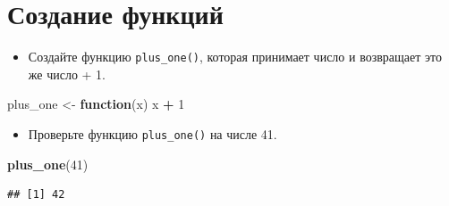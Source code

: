 \documentclass[]{book}
\newenvironment{Shaded}{\begin{snugshade}}{\end{snugshade}}
\newcommand{\KeywordTok}[1]{\textcolor[rgb]{0.13,0.29,0.53}{\textbf{#1}}}
\newcommand{\DecValTok}[1]{\textcolor[rgb]{0.00,0.00,0.81}{#1}}
\newcommand{\StringTok}[1]{\textcolor[rgb]{0.31,0.60,0.02}{#1}}
\newcommand{\CommentTok}[1]{\textcolor[rgb]{0.56,0.35,0.01}{\textit{#1}}}
\newcommand{\ControlFlowTok}[1]{\textcolor[rgb]{0.13,0.29,0.53}{\textbf{#1}}}
\newcommand{\OperatorTok}[1]{\textcolor[rgb]{0.81,0.36,0.00}{\textbf{#1}}}
\newcommand{\NormalTok}[1]{#1}
\providecommand{\tightlist}{%
  \setlength{\itemsep}{0pt}\setlength{\parskip}{0pt}}
\begin{document}
\begin{Shaded}
\end{Shaded}

\section{Создание функций}\label{solution_function}

\begin{itemize}
\tightlist
\item
  Создайте функцию \texttt{plus\_one()}, которая принимает число и
  возвращает это же число + 1.
\end{itemize}

\begin{Shaded}
\begin{Highlighting}[]
\NormalTok{plus_one <-}\StringTok{ }\ControlFlowTok{function}\NormalTok{(x) x }\OperatorTok{+}\StringTok{ }\DecValTok{1}
\end{Highlighting}
\end{Shaded}

\begin{itemize}
\tightlist
\item
  Проверьте функцию \texttt{plus\_one()} на числе 41.
\end{itemize}

\begin{Shaded}
\begin{Highlighting}[]
\KeywordTok{plus_one}\NormalTok{(}\DecValTok{41}\NormalTok{)}
\end{Highlighting}
\end{Shaded}

\begin{verbatim}
## [1] 42
\end{verbatim}
\end{document}
